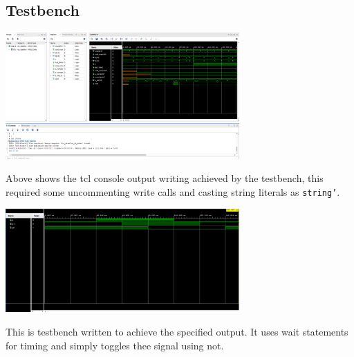 \documentclass[11pt]{article}
\begin{document}
\begin{preview}
  \subsection{Testbench}
  \begin{center}
    \includegraphics[width=0.67\textwidth]{inc/3_3_1.PNG}
  \end{center}

  Above shows the tcl console output writing achieved by the testbench, this required some uncommenting write calls and casting string literals as \texttt{string'}.

  
  \begin{center}
    \includegraphics[width=0.67\textwidth]{inc/3_3_2.PNG}
  \end{center}

  This is testbench written to achieve the specified output. It uses wait statements for timing and simply toggles thee signal using not. 

\appendix
\end{preview}
\end{document}
